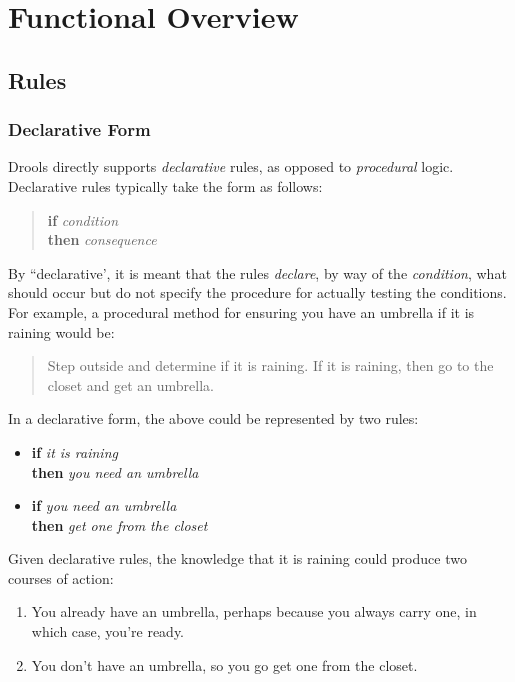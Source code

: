 \chapter{Functional Overview}

\section{Rules}

\subsection{Declarative Form}

Drools directly supports \emph{declarative} rules,
as opposed to \emph{procedural} logic.  Declarative
rules typically take the form as follows:

\begin{quote}
  \textbf{if} \emph{condition} \\
    \textbf{then} \emph{consequence}
\end{quote}

By ``declarative', it is meant that the rules \emph{declare}, by
way of the \emph{condition}, what should occur but do not specify the
procedure for actually testing the conditions. 
For example, a procedural method for ensuring you have an umbrella if
it is raining would be:

\begin{quote}
    Step outside and determine if it is raining.  If it is raining,
then go to the closet and get an umbrella.
\end{quote}

\noindent
In a declarative form, the above could be represented by two rules:

\begin{itemize}
  \item \textbf{if} \emph{it is raining} \\
    \textbf{then} \emph{you need an umbrella}
  \item \textbf{if} \emph{you need an umbrella} \\
    \textbf{then} \emph{get one from the closet}
\end{itemize}

Given declarative rules, the knowledge that it is raining could
produce two courses of action:

\begin{enumerate}
  \item You already have an umbrella, perhaps because you always carry
one, in which case, you're ready.
  \item You don't have an umbrella, so you go get one from the closet.
\end{enumerate}

